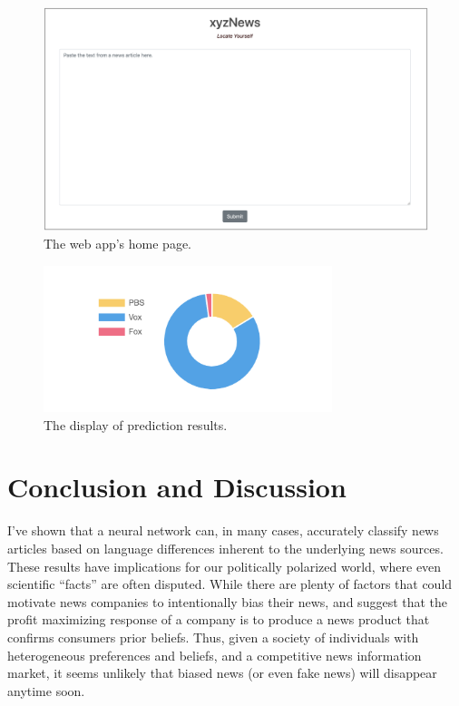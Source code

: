 \documentclass{article}
\begin{document}
	\begin{figure}[H]
		\includegraphics[width=\textwidth]{figures/images/web-form.png}
		\caption{The web app's home page.}
		\label{fig:form}
	\end{figure}

	\begin{figure}[H]
		\centering
		\includegraphics[width=0.75\textwidth]{figures/images/web-results.png}
		\caption{The display of prediction results.}
		\label{fig:results}
	\end{figure}

		
	\section{Conclusion and Discussion}
	I've shown that a neural network can, in many cases, accurately classify news articles based on language differences inherent to the underlying news sources. These results have implications for our politically polarized world, where even scientific ``facts'' are often disputed. While there are plenty of factors that could motivate news companies to intentionally bias their news,  \citet{gentzkow2008competition} and \citet{gentzkow2006media} suggest that the profit maximizing response of a company is to produce a news product that confirms consumers prior beliefs. Thus, given a society of individuals with heterogeneous preferences and beliefs, and a competitive news information market, it seems unlikely that biased news (or even fake news) will disappear anytime soon. 
	
\end{document}
